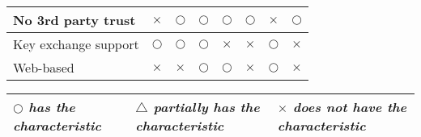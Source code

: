 {\begin{landscape}
\begin{table}[]
\begin{tabular}{|l|c|c|c|c|c|c|c|}
No 3rd party trust                                                       & $\times$                                                                             & $\bigcirc$                                                                             & $\bigcirc$                                                                            & $\bigcirc$                                & $\bigcirc$                                                                             & $\times$                                                                                 & $\bigcirc$                                \\ \hline
Key exchange support                                                          & $\bigcirc$                                                                             & $\bigcirc$                                                                             & $\bigcirc$                                                                            & $\times$                                & $\times$                                                                             & $\bigcirc$                                                                                 & $\times$                                \\ \hline
Web-based                                                                     & $\times$                                                                             & $\times$                                                                             & $\bigcirc$                                                                            & $\bigcirc$                                & $\times$                                                                             & $\bigcirc$                                                                                 & $\times$                                \\ \hline
\end{tabular}
\end{table}

\begin{table}[]
\centering
\begin{tabular}{|l|l|l|}
\hline
{\it $\bigcirc$ has the characteristic} & {\it $\bigtriangleup$ partially has the characteristic} & {\it $\times$ does not have the characteristic} \\ \hline
\end{tabular}
\end{table}

  \end{landscape}
  \clearpage
}

\clearpage
